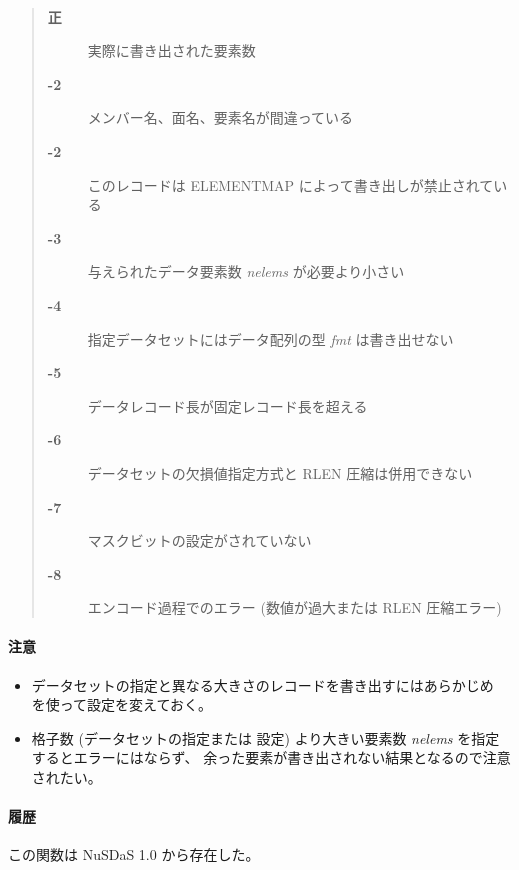 \paragraph{\ResultCode}
\begin{quote}
\begin{description}
\item[{\bf 正}] 実際に書き出された要素数
\item[{\bf -2}] メンバー名、面名、要素名が間違っている
\item[{\bf -2}] このレコードは ELEMENTMAP によって書き出しが禁止されている
\item[{\bf -3}] 与えられたデータ要素数 {\it nelems} が必要より小さい
\item[{\bf -4}] 指定データセットにはデータ配列の型 {\it fmt} は書き出せない
\item[{\bf -5}] データレコード長が固定レコード長を超える
\item[{\bf -6}] データセットの欠損値指定方式と RLEN 圧縮は併用できない
\item[{\bf -7}] マスクビットの設定がされていない
\item[{\bf -8}] エンコード過程でのエラー (数値が過大または RLEN 圧縮エラー)
\end{description}\end{quote}

\paragraph{注意}
\begin{itemize}
\item データセットの指定と異なる大きさのレコードを書き出すにはあらかじめ
 を使って設定を変えておく。
\item 格子数 (データセットの指定または  設定)
より大きい要素数 {\it nelems} を指定するとエラーにはならず、
余った要素が書き出されない結果となるので注意されたい。
\end{itemize}

\paragraph{履歴}
この関数は NuSDaS 1.0 から存在した。
